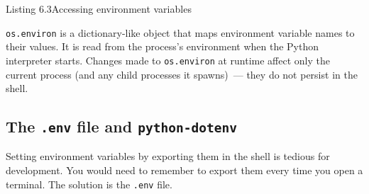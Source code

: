 \begin{codeboxcap}[short]{\textcolor{accent}{Listing 6.3}\enspace Accessing environment variables}

\begin{Shaded}
\begin{Highlighting}[]

\OperatorTok{=}\NormalTok{)}

\OperatorTok{=}\NormalTok{, }\NormalTok{)}

\OperatorTok{=}\NormalTok{ os.environ[}\NormalTok{]}

\OperatorTok{=}  

    \NormalTok{(}\SpecialCharTok{\{}\SpecialCharTok{\}}\SpecialStringTok{=}\SpecialCharTok{\{}\SpecialCharTok{\}}\NormalTok{)}
\end{Highlighting}
\end{Shaded}

\end{codeboxcap}

\noindent{}\texttt{os.environ} is a dictionary-like object that maps environment variable names to their values. It is read from the process's environment when the Python interpreter starts. Changes made to \texttt{os.environ} at runtime affect only the current process (and any child processes it spawns)~--- they do not persist in the shell.

\subsection*{\texorpdfstring{The \texttt{.env} file and \texttt{python-dotenv}}{The .env file and python-dotenv}}\label{06-local-dependencies:the-env-file-and-python-dotenv}

Setting environment variables by exporting them in the shell is tedious for development. You would need to remember to export them every time you open a terminal. The solution is the \texttt{.env} file.

